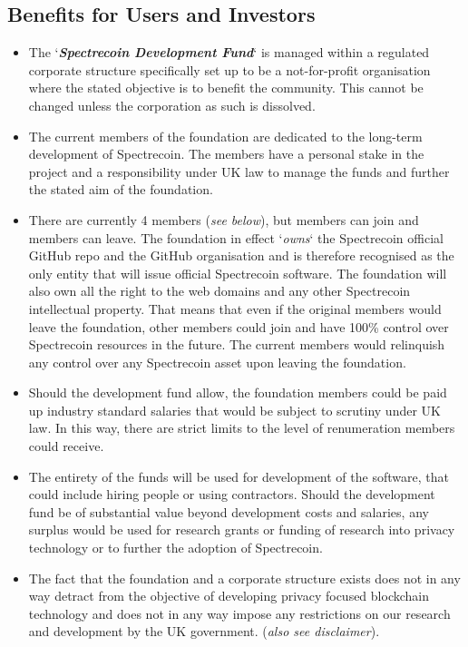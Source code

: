 \subsection{Benefits for Users and Investors}
\begin{itemize}
	\item The ‘\textbf{\textit{Spectrecoin Development Fund}}‘ is managed
	within a regulated corporate structure specifically set up to be a
	not-for-profit organisation where the stated objective is to benefit
	the community. This cannot be changed unless the corporation as such
	is dissolved.
	\item The current members of the foundation are dedicated to the long-term
	development of Spectrecoin. The members have a personal stake in the
	project and a responsibility under UK law to manage the funds and further
	the stated aim of the foundation.
	\item There are currently 4 members (\textit{see below}), but members can
	join and members can leave. The foundation in effect ‘\textit{owns}‘ the
	Spectrecoin official GitHub repo and the GitHub organisation and is
	therefore recognised as the only entity that will issue official
	Spectrecoin software. The foundation will also own all the right to the
	web domains and any other Spectrecoin intellectual property. That means
	that even if the original members would leave the foundation, other
	members could join and have 100\% control over Spectrecoin resources in
	the future. The current members would relinquish any control over any
	Spectrecoin asset upon leaving the foundation.
	\item Should the development fund allow, the foundation members could be
	paid up industry standard salaries that would be subject to scrutiny
	under UK law. In this way, there are strict limits to the level of
	renumeration members could receive.
	\item The entirety of the funds will be used for development of the
	software, that could include hiring people or using contractors. Should
	the development fund be of substantial value beyond development costs
	and salaries, any surplus would be used for research grants or funding
	of research into privacy technology or to further the adoption of
	Spectrecoin.
	\item The fact that the foundation and a corporate structure exists
	does not in any way detract from the objective of developing privacy
	focused blockchain technology and does not in any way impose any
	restrictions on our research and development by the UK government.
	(\textit{also see disclaimer}).
\end{itemize}



